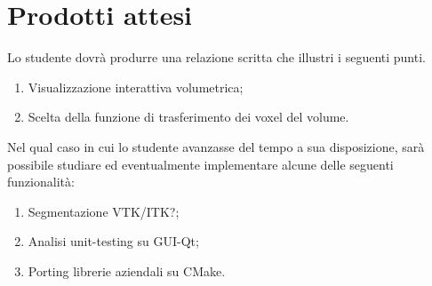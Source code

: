 \section*{Prodotti attesi}
Lo studente dovrà produrre una relazione scritta che illustri i seguenti punti.
\begin{enumerate}
    \item Visualizzazione interattiva volumetrica;
    
    \item Scelta della funzione di trasferimento dei voxel del volume.
\end{enumerate}

Nel qual caso in cui lo studente avanzasse del tempo a sua disposizione, sarà possibile studiare ed eventualmente implementare alcune delle seguenti funzionalità:
\begin{enumerate}
    \item Segmentazione VTK/ITK?;
    
    \item Analisi unit-testing su GUI-Qt;
    
    \item Porting librerie aziendali su CMake.
\end{enumerate}
